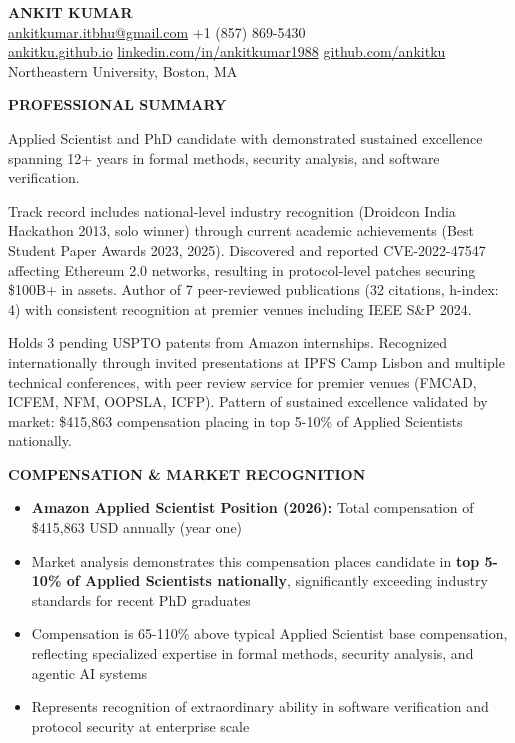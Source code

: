 \documentclass[11pt,letterpaper]{article}
\newcommand{\cvsection}[1]{
    \vspace{0.6em}
    {\color{darkblue}\textbf{\Large #1}}
    \vspace{0.15em}
    \textcolor{lightblue}{\hrulefill}
    \vspace{0.4em}
}
\begin{document}
\begin{center}
    {\Huge \textbf{\color{darkblue}ANKIT KUMAR}} \\
    \vspace{0.4em}
    \large
    \href{mailto:ankitkumar.itbhu@gmail.com}{ankitkumar.itbhu@gmail.com} 
    \textcolor{mediumgray}{\textbullet} 
    +1 (857) 869-5430 \\
    \vspace{0.1em}
    \href{https://ankitku.github.io}{ankitku.github.io} 
    \textcolor{mediumgray}{\textbullet} 
    \href{https://linkedin.com/in/ankitkumar1988}{linkedin.com/in/ankitkumar1988} 
    \textcolor{mediumgray}{\textbullet} 
    \href{https://github.com/ankitku}{github.com/ankitku} \\
    \vspace{0.1em}
    Northeastern University, Boston, MA
\end{center}

\cvsection{PROFESSIONAL SUMMARY}
\normalsize

Applied Scientist and PhD candidate with demonstrated sustained excellence spanning 12+ years in formal methods, security analysis, and software verification. 

Track record includes national-level industry recognition (Droidcon India Hackathon 2013, solo winner) through current academic achievements (Best Student Paper Awards 2023, 2025). Discovered and reported CVE-2022-47547 affecting Ethereum 2.0 networks, resulting in protocol-level patches securing \$100B+ in assets. Author of 7 peer-reviewed publications (32 citations, h-index: 4) with consistent recognition at premier venues including IEEE S\&P 2024. 

Holds 3 pending USPTO patents from Amazon internships. Recognized internationally through invited presentations at IPFS Camp Lisbon and multiple technical conferences, with peer review service for premier venues (FMCAD, ICFEM, NFM, OOPSLA, ICFP). Pattern of sustained excellence validated by market: \$415,863 compensation placing in top 5-10\% of Applied Scientists nationally.

\cvsection{COMPENSATION \& MARKET RECOGNITION}
\begin{itemize}
    \item \textbf{Amazon Applied Scientist Position (2026):} Total compensation of \$415,863 USD annually (year one)
    \item Market analysis demonstrates this compensation places candidate in \textbf{top 5-10\% of Applied Scientists nationally}, significantly exceeding industry standards for recent PhD graduates
    \item Compensation is 65-110\% above typical Applied Scientist base compensation, reflecting specialized expertise in formal methods, security analysis, and agentic AI systems
    \item Represents recognition of extraordinary ability in software verification and protocol security at enterprise scale
\end{itemize}
\end{document}
